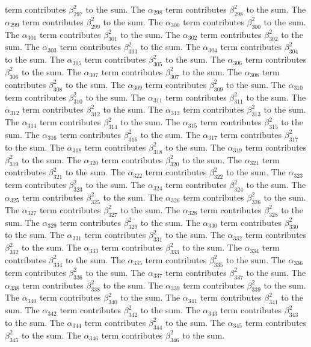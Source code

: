 \begin{lemma}
term contributes $\beta_{297}^{2}$ to the sum. The $\alpha_{298}$ term contributes $\beta_{298}^{2}$ to the sum. The $\alpha_{299}$ term contributes $\beta_{299}^{2}$ to the sum. The $\alpha_{300}$ term contributes $\beta_{300}^{2}$ to the sum. The $\alpha_{301}$ term contributes $\beta_{301}^{2}$ to the sum. The $\alpha_{302}$ term contributes $\beta_{302}^{2}$ to the sum. The $\alpha_{303}$ term contributes $\beta_{303}^{2}$ to the sum. The $\alpha_{304}$ term contributes $\beta_{304}^{2}$ to the sum. The $\alpha_{305}$ term contributes $\beta_{305}^{2}$ to the sum. The $\alpha_{306}$ term contributes $\beta_{306}^{2}$ to the sum. The $\alpha_{307}$ term contributes $\beta_{307}^{2}$ to the sum. The $\alpha_{308}$ term contributes $\beta_{308}^{2}$ to the sum. The $\alpha_{309}$ term contributes $\beta_{309}^{2}$ to the sum. The $\alpha_{310}$ term contributes $\beta_{310}^{2}$ to the sum. The $\alpha_{311}$ term contributes $\beta_{311}^{2}$ to the sum. The $\alpha_{312}$ term contributes $\beta_{312}^{2}$ to the sum. The $\alpha_{313}$ term contributes $\beta_{313}^{2}$ to the sum. The $\alpha_{314}$ term contributes $\beta_{314}^{2}$ to the sum. The $\alpha_{315}$ term contributes $\beta_{315}^{2}$ to the sum. The $\alpha_{316}$ term contributes $\beta_{316}^{2}$ to the sum. The $\alpha_{317}$ term contributes $\beta_{317}^{2}$ to the sum. The $\alpha_{318}$ term contributes $\beta_{318}^{2}$ to the sum. The $\alpha_{319}$ term contributes $\beta_{319}^{2}$ to the sum. The $\alpha_{320}$ term contributes $\beta_{320}^{2}$ to the sum. The $\alpha_{321}$ term contributes $\beta_{321}^{2}$ to the sum. The $\alpha_{322}$ term contributes $\beta_{322}^{2}$ to the sum. The $\alpha_{323}$ term contributes $\beta_{323}^{2}$ to the sum. The $\alpha_{324}$ term contributes $\beta_{324}^{2}$ to the sum. The $\alpha_{325}$ term contributes $\beta_{325}^{2}$ to the sum. The $\alpha_{326}$ term contributes $\beta_{326}^{2}$ to the sum. The $\alpha_{327}$ term contributes $\beta_{327}^{2}$ to the sum. The $\alpha_{328}$ term contributes $\beta_{328}^{2}$ to the sum. The $\alpha_{329}$ term contributes $\beta_{329}^{2}$ to the sum. The $\alpha_{330}$ term contributes $\beta_{330}^{2}$ to the sum. The $\alpha_{331}$ term contributes $\beta_{331}^{2}$ to the sum. The $\alpha_{332}$ term contributes $\beta_{332}^{2}$ to the sum. The $\alpha_{333}$ term contributes $\beta_{333}^{2}$ to the sum. The $\alpha_{334}$ term contributes $\beta_{334}^{2}$ to the sum. The $\alpha_{335}$ term contributes $\beta_{335}^{2}$ to the sum. The $\alpha_{336}$ term contributes $\beta_{336}^{2}$ to the sum. The $\alpha_{337}$ term contributes $\beta_{337}^{2}$ to the sum. The $\alpha_{338}$ term contributes $\beta_{338}^{2}$ to the sum. The $\alpha_{339}$ term contributes $\beta_{339}^{2}$ to the sum. The $\alpha_{340}$ term contributes $\beta_{340}^{2}$ to the sum. The $\alpha_{341}$ term contributes $\beta_{341}^{2}$ to the sum. The $\alpha_{342}$ term contributes $\beta_{342}^{2}$ to the sum. The $\alpha_{343}$ term contributes $\beta_{343}^{2}$ to the sum. The $\alpha_{344}$ term contributes $\beta_{344}^{2}$ to the sum. The $\alpha_{345}$ term contributes $\beta_{345}^{2}$ to the sum. The $\alpha_{346}$ term contributes $\beta_{346}^{2}$ to the sum. 
\end{lemma}

